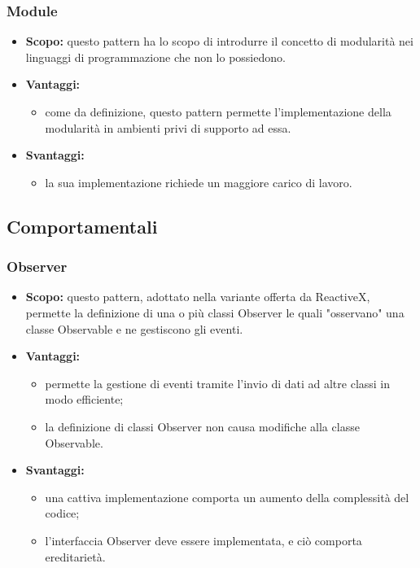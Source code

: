 	 \subsubsection{Module}
      \begin{itemize}
       \item \textbf{Scopo:} questo pattern ha lo scopo di introdurre il concetto di modularità nei linguaggi di programmazione che non lo possiedono.
	\item \textbf{Vantaggi:}
	  \begin{itemize}
	   \item come da definizione, questo pattern permette l'implementazione della modularità in ambienti privi di supporto ad essa.
	  \end{itemize}
	\item \textbf{Svantaggi:}
	  \begin{itemize}
	   \item la sua implementazione richiede un maggiore carico di lavoro.
	  \end{itemize}
	\end{itemize}
	  \newpage
  \subsection{Comportamentali}
    \subsubsection{Observer}
      \begin{itemize}
       \item \textbf{Scopo:} questo pattern, adottato nella variante offerta da ReactiveX, permette la definizione di una o più classi Observer le quali "osservano" una classe Observable e ne gestiscono gli eventi.
	\item \textbf{Vantaggi:}
	  \begin{itemize}
	   \item permette la gestione di eventi tramite l'invio di dati ad altre classi in modo efficiente;
	   \item la definizione di classi Observer non causa modifiche alla classe Observable.
	  \end{itemize}
	\item \textbf{Svantaggi:}
	  \begin{itemize}
	   \item una cattiva implementazione comporta un aumento della complessità del codice;
	   \item l'interfaccia Observer deve essere implementata, e ciò comporta ereditarietà.
	  \end{itemize}
	\end{itemize}


